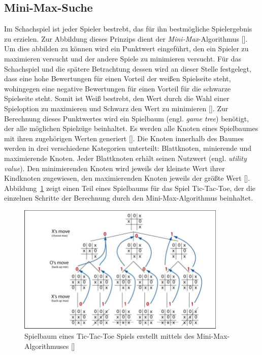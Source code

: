 \subsection{Mini-Max-Suche}

Im Schachspiel ist jeder Spieler bestrebt, das für ihn bestmögliche Spielergebnis zu erzielen.
Zur Abbildung dieses Prinzips dient der \textit{Mini-Max}-Algorithmus [\cite{Russell2010}].
Um dies abbilden zu können wird ein Punktwert eingeführt, den ein Spieler zu maximieren versucht und der andere Spiele zu minimieren versucht.
Für das Schachspiel und die spätere Betrachtung dessen wird an dieser Stelle festgelegt, dass eine hohe Bewertungen für einen Vorteil der weißen Spielseite steht, wohingegen eine negative Bewertungen für einen Vorteil für die schwarze Spielseite steht.
Somit ist Weiß bestrebt, den Wert durch die Wahl einer Spieloption zu maximieren und Schwarz den Wert zu minimieren [\cite{Paulsen2009}].
Zur Berechnung dieses Punktwertes wird ein Spielbaum (engl. \textit{game tree}) benötigt, der alle möglichen Spielzüge beinhaltet.
Es werden alle Knoten eines Spielbaumes mit ihren zugehörigen Werten generiert [\cite{Shah2007}].
Die Knoten innerhalb des Baumes werden in drei verschiedene Kategorien unterteilt: Blattknoten, minierende und maximierende Knoten.
Jeder Blattknoten erhält seinen Nutzwert (engl. \textit{utility value}).
Den minimierenden Knoten wird jeweils der kleinste Wert ihrer Kindknoten zugewiesen, den maximierenden Knoten jeweils der größte Wert [\cite{Shah2007}].
Abbildung~\ref{fig:minimax_tic-tac-toe} zeigt einen Teil eines Spielbaums für das Spiel Tic-Tac-Toe, der die einzelnen Schritte der Berechnung durch den Mini-Max-Algorithmus beinhaltet.

\begin{figure}
    \centering
    \includegraphics[width=0.89\textwidth]{images/theory/minimax_tic-tac-toe.png}
    \caption[Spielbaum eines Tic-Tac-Toe Spiels erstellt mittels des Mini-Max-Algorithmuses]{Spielbaum eines Tic-Tac-Toe Spiels erstellt mittels des Mini-Max-Algorithmuses [\cite{Elnaggar2014}]}
    \label{fig:minimax_tic-tac-toe}
\end{figure}

